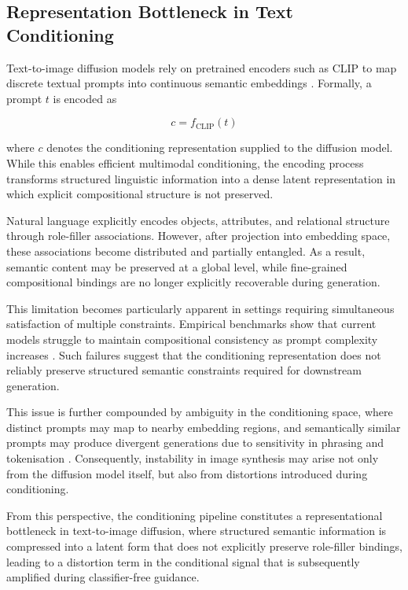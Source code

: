 \documentclass[a4paper,twoside,12pt]{report}
\begin{document}
\subsection{Representation Bottleneck in Text Conditioning}

Text-to-image diffusion models rely on pretrained encoders such as CLIP to map discrete textual prompts into continuous semantic embeddings \citep{radford2021clip}. Formally, a prompt \(t\) is encoded as

\begin{equation}
c = f_{\text{CLIP}}(t)
\end{equation}

where \(c\) denotes the conditioning representation supplied to the diffusion model. While this enables efficient multimodal conditioning, the encoding process transforms structured linguistic information into a dense latent representation in which explicit compositional structure is not preserved.

Natural language explicitly encodes objects, attributes, and relational structure through role-filler associations. However, after projection into embedding space, these associations become distributed and partially entangled. As a result, semantic content may be preserved at a global level, while fine-grained compositional bindings are no longer explicitly recoverable during generation.

This limitation becomes particularly apparent in settings requiring simultaneous satisfaction of multiple constraints. Empirical benchmarks show that current models struggle to maintain compositional consistency as prompt complexity increases \citep{liu2022composable, huang2023t2icompbench, saharia2022imagen}. Such failures suggest that the conditioning representation does not reliably preserve structured semantic constraints required for downstream generation.

This issue is further compounded by ambiguity in the conditioning space, where distinct prompts may map to nearby embedding regions, and semantically similar prompts may produce divergent generations due to sensitivity in phrasing and tokenisation \citep{mehrabi2023ambiguities, elsharif2025ambiguity}. Consequently, instability in image synthesis may arise not only from the diffusion model itself, but also from distortions introduced during conditioning.

From this perspective, the conditioning pipeline constitutes a representational bottleneck in text-to-image diffusion, where structured semantic information is compressed into a latent form that does not explicitly preserve role-filler bindings, leading to a distortion term in the conditional signal that is subsequently amplified during classifier-free guidance.
\end{document}

